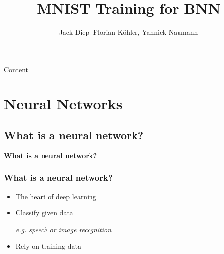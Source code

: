 \documentclass[aspectratio=1610, 12pt]{beamer}
\title{MNIST Training for BNN}
\author[Diep, Köhler, Naumann]{Jack Diep, Florian Köhler, Yannick Naumann}
\institute[BNN-Training]{Design Your Own CPU - Design of Embedded Systems}
\begin{document}
\maketitle




\begin{frame}{Content}
	\tableofcontents


\end{frame}
\section{Neural Networks}

\subsection{What is a neural network?}

\begin{frame}
	\centering
	\vfill
	\textbf{\Large What is a neural network?}
	\vfill
\end{frame}

\begin{frame}
	\frametitle{What is a neural network?}

	\begin{itemize}
		\item<+-> The heart of deep learning
		\item<+-> Classify given data

		\emph{e.g. speech or image recognition}

		\item<+-> Rely on training data
	\end{itemize}

\end{frame}
\end{document}
